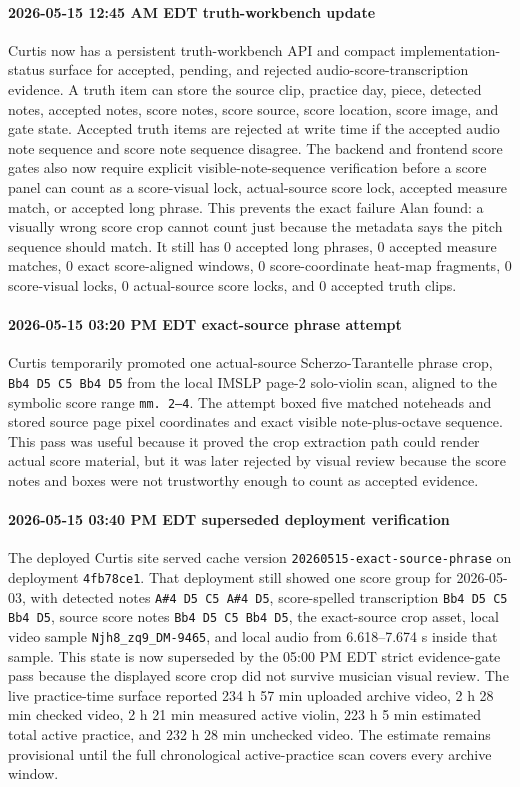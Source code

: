 \paragraph{2026-05-15 12:45 AM EDT truth-workbench update} Curtis now has a persistent truth-workbench API and compact implementation-status surface for accepted, pending, and rejected audio-score-transcription evidence. A truth item can store the source clip, practice day, piece, detected notes, accepted notes, score notes, score source, score location, score image, and gate state. Accepted truth items are rejected at write time if the accepted audio note sequence and score note sequence disagree. The backend and frontend score gates also now require explicit visible-note-sequence verification before a score panel can count as a score-visual lock, actual-source score lock, accepted measure match, or accepted long phrase. This prevents the exact failure Alan found: a visually wrong score crop cannot count just because the metadata says the pitch sequence should match. It still has 0 accepted long phrases, 0 accepted measure matches, 0 exact score-aligned windows, 0 score-coordinate heat-map fragments, 0 score-visual locks, 0 actual-source score locks, and 0 accepted truth clips.

\paragraph{2026-05-15 03:20 PM EDT exact-source phrase attempt} Curtis temporarily promoted one actual-source Scherzo-Tarantelle phrase crop, \texttt{Bb4 D5 C5 Bb4 D5} from the local IMSLP page-2 solo-violin scan, aligned to the symbolic score range \texttt{mm. 2--4}. The attempt boxed five matched noteheads and stored source page pixel coordinates and exact visible note-plus-octave sequence. This pass was useful because it proved the crop extraction path could render actual score material, but it was later rejected by visual review because the score notes and boxes were not trustworthy enough to count as accepted evidence.

\paragraph{2026-05-15 03:40 PM EDT superseded deployment verification} The deployed Curtis site served cache version \texttt{20260515-exact-source-phrase} on deployment \texttt{4fb78ce1}. That deployment still showed one score group for 2026-05-03, with detected notes \texttt{A\#4 D5 C5 A\#4 D5}, score-spelled transcription \texttt{Bb4 D5 C5 Bb4 D5}, source score notes \texttt{Bb4 D5 C5 Bb4 D5}, the exact-source crop asset, local video sample \texttt{Njh8\_zq9\_DM-9465}, and local audio from 6.618--7.674 s inside that sample. This state is now superseded by the 05:00 PM EDT strict evidence-gate pass because the displayed score crop did not survive musician visual review. The live practice-time surface reported 234 h 57 min uploaded archive video, 2 h 28 min checked video, 2 h 21 min measured active violin, 223 h 5 min estimated total active practice, and 232 h 28 min unchecked video. The estimate remains provisional until the full chronological active-practice scan covers every archive window.

